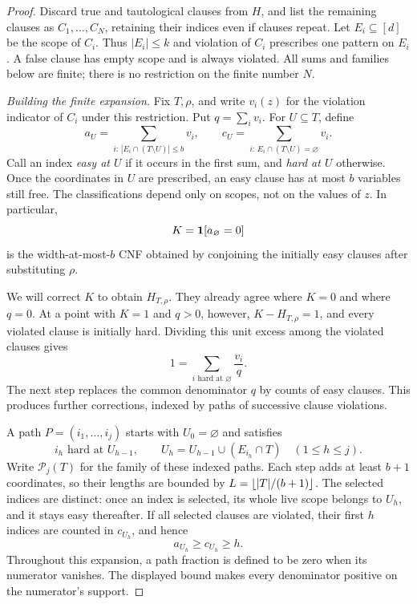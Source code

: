\begin{proof}
Discard true and tautological clauses from $H$, and list the remaining
clauses as $C_1,\ldots,C_N$, retaining their indices even if clauses repeat.
Let $E_i\subseteq[d]$ be the scope of $C_i$.  Thus $|E_i|\leq k$ and violation
of $C_i$ prescribes one pattern on $E_i$.  A false clause has empty scope
and is always violated.  All sums and families below are finite; there is
no restriction on the finite number $N$.

\medskip\noindent
\textit{Building the finite expansion.}
Fix $T,\rho$, and write $v_i(z)$ for the violation indicator of $C_i$
under this restriction.  Put $q=\sum_i v_i$.  For $U\subseteq T$, define
\begin{equation}\label{eq:restriction-counts}
  a_U=\sum_{i:\,|E_i\cap(T\setminus U)|\leq b}v_i,
  \qquad
  c_U=\sum_{i:\,E_i\cap(T\setminus U)=\varnothing}v_i.
\end{equation}
Call an index \emph{easy at $U$} if it occurs in the first sum, and
\emph{hard at $U$} otherwise.  Once the coordinates in $U$ are prescribed,
an easy clause has at most $b$ variables still free.  The classifications
depend only on scopes, not on the values of $z$.  In particular,
\[
  K=\mathbf 1[a_{\varnothing}=0]
\]
is the width-at-most-$b$ CNF obtained by conjoining the initially easy
clauses after substituting $\rho$.

We will correct $K$ to obtain $H_{T,\rho}$.  They already agree where
$K=0$ and where $q=0$.  At a point with $K=1$ and $q>0$, however,
$K-H_{T,\rho}=1$, and every violated clause is initially hard.  Dividing
this unit excess among the violated clauses gives
\[
  1=\sum_{i\text{ hard at }\varnothing}\frac{v_i}{q}.
\]
The next step replaces the common denominator $q$ by counts of easy
clauses.  This produces further corrections, indexed by paths of
successive clause violations.

A path $P=(i_1,\ldots,i_j)$ starts with $U_0=\varnothing$ and satisfies
\begin{equation}\label{eq:restriction-path}
  i_h\text{ hard at }U_{h-1},
  \qquad U_h=U_{h-1}\cup(E_{i_h}\cap T)
  \quad(1\leq h\leq j).
\end{equation}
Write $\mathcal P_j(T)$ for the family of these indexed paths.
Each step adds at least $b+1$ coordinates, so their lengths are bounded
by $L=\left\lfloor|T|/(b+1)\right\rfloor$.  The selected indices are distinct: once an
index is selected, its whole live scope belongs to $U_h$, and it stays
easy thereafter.  If all selected clauses are violated, their first
$h$ indices are counted in $c_{U_h}$, and hence
\begin{equation}\label{eq:restriction-positive-count}
  a_{U_h}\geq c_{U_h}\geq h.
\end{equation}
Throughout this expansion, a path fraction is defined to be zero when
its numerator vanishes.  The displayed bound makes every denominator
positive on the numerator's support.


\end{proof}
